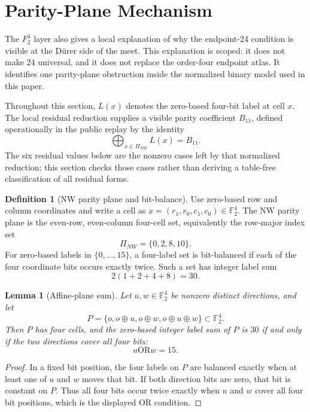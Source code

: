\documentclass[11pt,a4paper]{article}
\newtheorem{lemma}[theorem]{Lemma}
\theoremstyle{definition}
\newtheorem{definition}[theorem]{Definition}
\theoremstyle{remark}
\newcommand{\F}{\mathbb F}
\newcommand{\Durer}{D\"urer\xspace}
\begin{document}
\section{Parity-Plane Mechanism}
\label{sec:parity-plane}

The \(F_2^4\) layer also gives a local explanation of why the endpoint-24
condition is visible at the \Durer side of the meet.  This explanation is
scoped: it does not make \(24\) universal, and it does not replace the
order-four endpoint atlas.  It identifies one parity-plane obstruction inside
the normalized binary model used in this paper.

Throughout this section, \(L(x)\) denotes the zero-based four-bit label at
cell \(x\).  The local residual reduction supplies a visible parity coefficient
\(B_{11}\), defined operationally in the public replay by the identity
\[
\bigoplus_{x\in\Pi_{NW}}L(x)=B_{11}.
\]
The six residual values below are the nonzero cases left by that normalized
reduction; this section checks those cases rather than deriving a table-free
classification of all residual forms.

\begin{definition}[NW parity plane and bit-balance]
Use zero-based row and column coordinates and write a cell as
\(x=(r_1,r_0,c_1,c_0)\in\F_2^4\).  The NW parity plane is the even-row,
even-column four-cell set, equivalently the row-major index set
\[
\Pi_{NW}=\{0,2,8,10\}.
\]
For zero-based labels in \(\{0,\ldots,15\}\), a four-label set is
bit-balanced if each of the four coordinate bits occurs exactly twice.  Such a
set has integer label sum
\[
2(1+2+4+8)=30.
\]
\end{definition}

\begin{lemma}[Affine-plane sum]
\label{lem:affine-plane-sum}
Let \(u,w\in\F_2^4\) be nonzero distinct directions, and let
\[
P=\{o,o\oplus u,o\oplus w,o\oplus u\oplus w\}\subset \F_2^4.
\]
Then \(P\) has four cells, and the zero-based integer label sum of \(P\) is \(30\) if and only if the two
directions cover all four bits:
\[
u\mathbin{\mathrm{OR}} w=15.
\]
\end{lemma}

\begin{proof}
In a fixed bit position, the four labels on \(P\) are balanced exactly when at
least one of \(u\) and \(w\) moves that bit.  If both direction bits are zero,
that bit is constant on \(P\).  Thus all four bits occur twice exactly when
\(u\) and \(w\) cover all four bit positions, which is the displayed OR
condition.
\end{proof}
\end{document}
